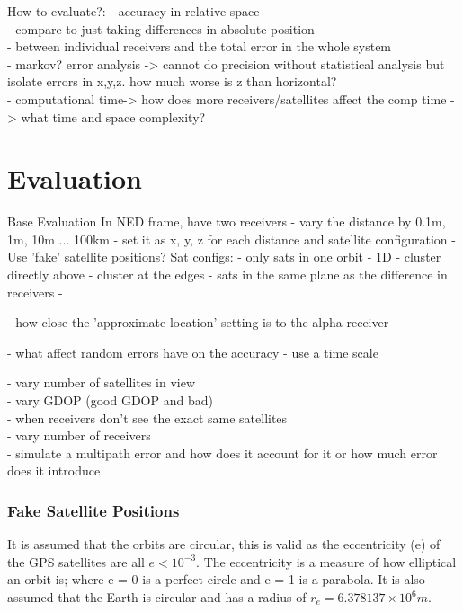 How to evaluate?:
- accuracy in relative space\\
- compare to just taking differences in absolute position \\
- between individual receivers and the total error in the whole system\\
- markov? error analysis -> cannot do precision without statistical analysis but isolate errors in x,y,z. how much worse is z than horizontal?\\
- computational time-> how does more receivers/satellites affect the comp time -> what time and space complexity?


\section{Evaluation}
Base Evaluation
In NED frame, have two receivers
- vary the distance by 0.1m, 1m, 10m ... 100km
- set it as x, y, z for each distance and satellite configuration
- Use 'fake' satellite positions?
Sat configs:
	- only sats in one orbit - 1D 
	- cluster directly above
	- cluster at the edges
	- sats in the same plane as the difference in receivers
	- 


- how close the 'approximate location' setting is to the alpha receiver

- what affect random errors have on the accuracy - use a time scale


- vary number of satellites in view\\
- vary GDOP (good GDOP and bad)\\
- when receivers don't see the exact same satellites \\
- vary number of receivers \\
- simulate a multipath error and how does it account for it or how much error does it introduce\\
\subsubsection{Fake Satellite Positions}
It is assumed that the orbits are circular, this is valid as the eccentricity (e) of the GPS satellites are all $e<10^{-3}$.  The eccentricity is a measure of how elliptical an orbit is; where e = 0 is a perfect circle and e = 1 is a parabola. It is also assumed that the Earth is circular and has a radius of 
$r_e = 6.378137\times10^6 m$.

